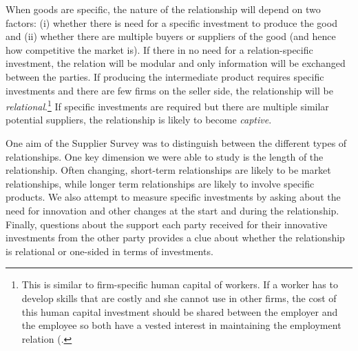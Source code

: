 \documentclass[final, dvipsnames, authoryear,12pt]{elsarticle}
\begin{document}
When goods are specific, the nature of the relationship will depend on two factors: (i) whether there is need for a specific investment to produce the good and (ii) whether there are multiple buyers or suppliers of the good (and hence how competitive the market is). If there in no need for a relation-specific investment, the relation will be modular and only information will be exchanged between the parties. If producing the intermediate product requires specific investments and there are few firms on the seller side, the relationship will be \textit{relational}.\footnote{This is similar to firm-specific human capital of workers. If a worker has to develop skills that are costly and she cannot use in other firms, the cost of this human capital investment should be shared between the employer and the employee so both have a vested interest in maintaining the employment relation (\cite{becker1962investment}.} If specific investments are required but there are multiple similar potential suppliers, the relationship is likely to become \textit{captive}.

One aim of the Supplier Survey was to distinguish between the different types of relationships. One key dimension we were able to study is the length of the relationship. Often changing, short-term relationships are likely to be market relationships, while longer term relationships are likely to involve specific products. We also attempt to measure specific investments by asking about the need for innovation and other changes at the start and during the relationship. Finally, questions about the support each party received for their innovative investments from the other party provides a clue about whether the relationship is relational or one-sided in terms of investments. 

    


\end{document}

